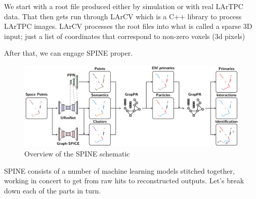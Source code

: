 We start with a root file produced either by simulation or with real LArTPC data.
That then gets run through LArCV  which is a C++ library to process LArTPC images.
LArCV processes the root files into what is called a sparse 3D input; just a list of coordinates that correspond to non-zero voxels (3d pixels)

After that, we can engage SPINE proper.

\begin{figure}[H]
  \includegraphics[width=120mm]{figures/spineSchematic.png}
  \caption{Overview of the SPINE schematic\cite{SPINE_schematic}}
  \label{spineSchematic}
\end{figure}

SPINE consists of a number of machine learning models stitched together, working in concert to get from raw hits to reconstructed outputs.
Let's break down each of the parts in turn.




















